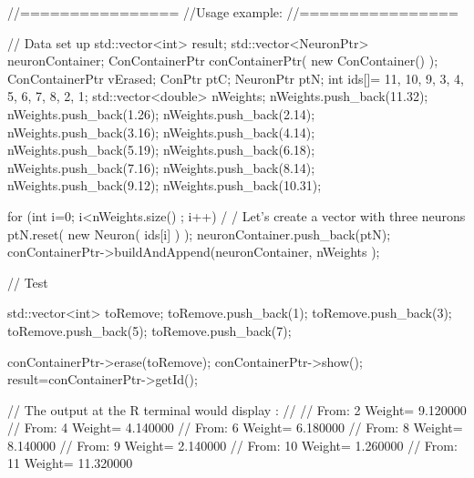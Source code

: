 \begin{DoxyCode}
        //================
        //Usage example:
        //================

        // Data set up
                        std::vector<int> result;
                        std::vector<NeuronPtr> neuronContainer;
                        ConContainerPtr conContainerPtr( new ConContainer() );
                        ConContainerPtr vErased;
                        ConPtr  ptC;
                        NeuronPtr ptN;
                        int ids[]= {11, 10, 9, 3, 4, 5, 6, 7, 8, 2, 1};
                        std::vector<double> nWeights;
                        nWeights.push_back(11.32);
                        nWeights.push_back(1.26);
                        nWeights.push_back(2.14);
                        nWeights.push_back(3.16);
                        nWeights.push_back(4.14);
                        nWeights.push_back(5.19);
                        nWeights.push_back(6.18);
                        nWeights.push_back(7.16);
                        nWeights.push_back(8.14);
                        nWeights.push_back(9.12);
                        nWeights.push_back(10.31);

                        for (int i=0; i<nWeights.size() ; i++) {                                /
      / Let's create a vector with three neurons
                                ptN.reset( new Neuron( ids[i] ) );
                                neuronContainer.push_back(ptN);
                        }
                        conContainerPtr->buildAndAppend(neuronContainer, nWeights
      );

                        // Test

                        std::vector<int> toRemove;
                        toRemove.push_back(1);
                        toRemove.push_back(3);
                        toRemove.push_back(5);
                        toRemove.push_back(7);

                        conContainerPtr->erase(toRemove);
                        conContainerPtr->show();
                        result=conContainerPtr->getId();

                // The output at the R terminal would display :
                //
                // From:         2       Weight=         9.120000
                // From:         4       Weight=         4.140000
                // From:         6       Weight=         6.180000
                // From:         8       Weight=         8.140000
                // From:         9       Weight=         2.140000
                // From:         10  Weight=     1.260000
                // From:         11  Weight=     11.320000
\end{DoxyCode}


